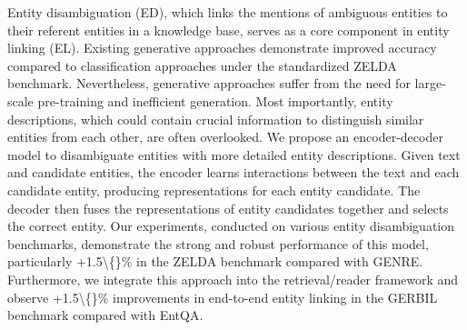 Entity disambiguation (ED), which links the mentions of ambiguous entities to their referent entities in a knowledge base, serves as a core component in entity linking (EL). Existing generative approaches demonstrate improved accuracy compared to classification approaches under the standardized ZELDA benchmark. Nevertheless, generative approaches suffer from the need for large-scale pre-training and inefficient generation. Most importantly, entity descriptions, which could contain crucial information to  distinguish similar entities from each other, are often overlooked. We propose an encoder-decoder model to disambiguate entities with more detailed entity descriptions. Given text and candidate entities, the encoder learns interactions between the text and each candidate entity, producing representations for each entity candidate. The decoder then fuses the representations of entity candidates together and selects the correct entity. Our experiments, conducted on various entity disambiguation benchmarks, demonstrate the strong and robust performance of this model, particularly +1.5\textbackslash\{\}\% in the ZELDA benchmark compared with GENRE. Furthermore, we integrate this approach into the retrieval/reader framework and observe +1.5\textbackslash\{\}\% improvements in end-to-end entity linking in the GERBIL benchmark compared with EntQA.